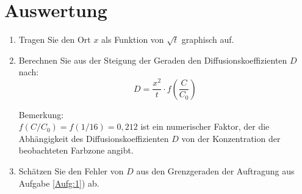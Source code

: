 \section{Auswertung} 
\begin{enumerate}
 \item Tragen Sie den Ort $x$ als Funktion von $\sqrt{t}$ graphisch auf. \label{Aufg:1}
 \item Berechnen Sie aus der Steigung der Geraden den Diffusionskoeffizienten $D$ nach:
  \begin{equation}
   D = \frac{x^2}{t}\cdot f\left(\frac{C}{C_0}\right)
  \end{equation}
	
	\noindent
	Bemerkung:\\ 
	\noindent
	$f\left(C/C_0\right) = f\left(1/16\right) = 0,212$ ist ein numerischer Faktor, der die Abhängigkeit des Diffusionskoeffizienten $D$ von der Konzentration der beobachteten Farbzone angibt.
 \item Schätzen Sie den Fehler von $D$ aus den Grenzgeraden der Auftragung aus Aufgabe \ref{Aufg:1}) ab.
\end{enumerate}